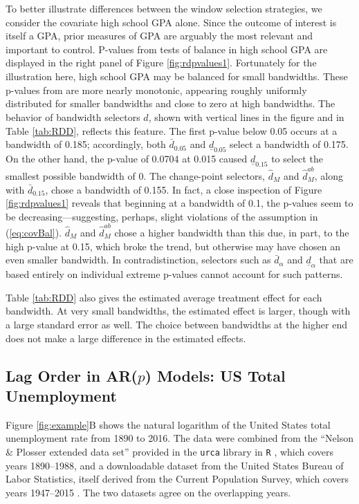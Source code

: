 \documentclass[12pt]{article}\usepackage[]{graphicx}\usepackage[]{color}
\newcommand{\dalphaU}{\bar{d}_\alpha}
\newcommand{\dalphaB}{\underline{d}_\alpha}
\newcommand{\dhat}{\hat{d}}
\newcommand{\dhatU}{\bar{d}}
\newcommand{\dhatB}{\underline{d}}
\newcommand{\dhatm}{\hat{d}_M}
\newcommand{\dhatmab}{\hat{d}^{ab}_M}
\begin{document}
To better illustrate differences between the window selection
strategies, we consider the covariate high school GPA alone.
Since the outcome of interest is itself a GPA, prior measures of GPA
are arguably the most relevant and important to control.
P-values from tests of balance in high school GPA are
displayed in the right panel of Figure \ref{fig:rdpvalues1}.
Fortunately for the illustration here, high school GPA may be
balanced for small bandwidths.
These p-values from are more nearly
monotonic, appearing roughly uniformly distributed for smaller
bandwidths and close to zero at high bandwidths.
The behavior of bandwidth selectors $\dhat$, shown with vertical lines
in the figure and in Table \ref{tab:RDD}, reflects this feature.
The first p-value below 0.05 occurs at a bandwidth of
0.185; accordingly, both $\dhatU_{0.05}$ and
$\dhatB_{0.05}$ select a bandwidth of 0.175.
On the other hand, the p-value of 0.0704 at 0.015
caused $\dhatB_{0.15}$ to select the smallest possible bandwidth of 0.
The change-point selectors, $\dhatm$ and $\dhatmab$, along with
$\dhatU_{0.15}$, chose a bandwidth of 0.155.
In fact, a close inspection of Figure \ref{fig:rdpvalues1} reveals
that beginning at a bandwidth of 0.1, the p-values seem to be
decreasing---suggesting, perhaps, slight violations of the assumption
in (\ref{eq:covBal}).
$\dhatm$ and $\dhatmab$ chose a higher bandwidth than this due, in
part, to the high p-value at 0.15, which broke the trend, but
otherwise may have chosen an even smaller bandwidth.
In contradistinction, selectors such as $\dalphaU$ and $\dalphaB$ that
are based entirely on individual extreme p-values cannot account for
such patterns.

Table \ref{tab:RDD} also gives the estimated average treatment effect
for each bandwidth.
At very small bandwidths, the estimated effect is larger, though with a
large standard error as well.
The choice between bandwidths at the higher end does not make a large
difference in the estimated effects.

\subsection{Lag Order in AR($p$) Models: US Total Unemployment}


Figure \ref{fig:example}B shows the natural logarithm of the United States total
unemployment rate from 1890 to 2016.
The data were combined from the ``Nelson \& Plosser extended data
set'' provided in the \texttt{urca} library in \texttt{R}
\citep{urca,Rcite}, which covers years 1890--1988, and a downloadable
dataset from the United States Bureau of Labor Statistics, itself
derived from the Current Population Survey, which covers years
1947--2015 \citep{cps}.
The two datasets agree on the overlapping years.
\end{document}
